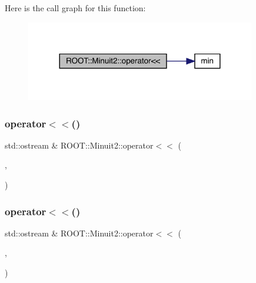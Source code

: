 Here is the call graph for this function\+:
\nopagebreak
\begin{figure}[H]
\begin{center}
\leavevmode
\includegraphics[width=284pt]{d6/d3a/namespaceROOT_1_1Minuit2_a172c627b1d5fd6191ca54f94090cd304_cgraph}
\end{center}
\end{figure}
\mbox{\label{namespaceROOT_1_1Minuit2_a687e586a693320c3d638977d002a9e50}} 
\subsubsection{\texorpdfstring{operator$<$$<$()}{operator<<()}\hspace{0.1cm}{\footnotesize\ttfamily [3/11]}}
{\footnotesize\ttfamily std\+::ostream \& R\+O\+O\+T\+::\+Minuit2\+::operator$<$$<$ (\begin{DoxyParamCaption}\item[{std\+::ostream \&}]{,  }\item[{const \mbox{\hyperlink{classROOT_1_1Minuit2_1_1LAVector}{L\+A\+Vector}} \&}]{ }\end{DoxyParamCaption})}

\mbox{\label{namespaceROOT_1_1Minuit2_a37c2d73b40109f988c5ea59e1edf1f8d}} 
\subsubsection{\texorpdfstring{operator$<$$<$()}{operator<<()}\hspace{0.1cm}{\footnotesize\ttfamily [4/11]}}
{\footnotesize\ttfamily std\+::ostream \& R\+O\+O\+T\+::\+Minuit2\+::operator$<$$<$ (\begin{DoxyParamCaption}\item[{std\+::ostream \&}]{,  }\item[{const \mbox{\hyperlink{classROOT_1_1Minuit2_1_1LASymMatrix}{L\+A\+Sym\+Matrix}} \&}]{ }\end{DoxyParamCaption})}

